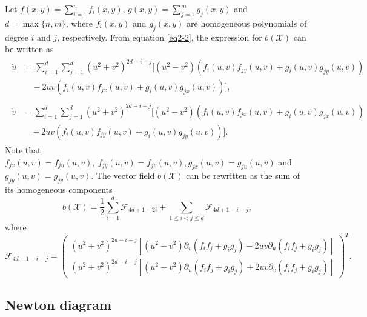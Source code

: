 \documentclass[reqno]{amsart}
\begin{document}
Let $f(x,y)=\sum_{i=1}^{n}f_{i}(x,y)$, $g(x,y)=\sum_{j=1}^{m}g_{j}(x,y)$ and 
$d=\max\{n,m\}$, where $f_{i}(x,y)$ and $g_{j}(x,y)$ are homogeneous polynomials of 
degree $i$ and $j$, respectively. From equation \eqref{eq2-2}, the expression for 
$b(\mathcal{X})$ can be written as
\begin{gather*} %
\begin{aligned}
\dot u &=  \sum_{i=1}^{d}\sum_{j=1}^{d}(u^{2}+v^{2})^{2d-i-j}[(u^{2}-v^{2})(f_{i}(u,v)f_{jy}(u,v)+g_{i}(u,v)g_{jy}(u,v)) \\
&\quad -2uv(f_{i}(u,v)f_{jx}(u,v)+g_{i}(u,v)g_{jx}(u,v))],
\end{aligned} \\
\begin{aligned}
\dot v  &=  \sum_{i=1}^{d}\sum_{j=1}^{d}(u^{2}+v^{2})^{2d-i-j}[(u^{2}-v^{2})(f_{i}(u,v)f_{jx}(u,v)+g_{i}(u,v)g_{jx}(u,v)) \\
&\quad +2uv(f_{i}(u,v)f_{jy}(u,v)+g_{i}(u,v)g_{jy}(u,v))].
\end{aligned}
\end{gather*}
Note that $f_{jx}(u,v)=f_{ju}(u,v),\ f_{jy}(u,v)=f_{jv}(u,v),
 g_{jx}(u,v)=g_{ju}(u,v)$ and $g_{jy}(u,v)=g_{jv}(u,v)$. 
The vector field $b(\mathcal{X})$ can be rewritten as the sum of its homogeneous 
components
\begin{equation}\label{eq2-4}
b(\mathcal{X})=\frac{1}{2}\sum_{i=1}^{d}\mathcal{F}_{4d+1-2i}
+\sum_{1\leq i<j\leq d}\mathcal{F}_{4d+1-i-j},
\end{equation}
where
\begin{equation}\label{eq2-5}
 \mathcal{F}_{4d+1-i-j}
= \begin{pmatrix}
 (u^{2}+v^{2})^{2d-i-j}[(u^{2}-v^{2})\partial_{v}(f_{i}f_{j}+g_{i}g_{j})
  -2uv\partial_{u}(f_{i}f_{j}+g_{i}g_{j})] \\
 (u^{2}+v^{2})^{2d-i-j}[(u^{2}-v^{2})\partial_{u}(f_{i}f_{j}+g_{i}g_{j})
  +2uv\partial_{v}(f_{i}f_{j}+g_{i}g_{j})]
\end{pmatrix}^T.
\end{equation}

\subsection{Newton diagram}
\end{document}
